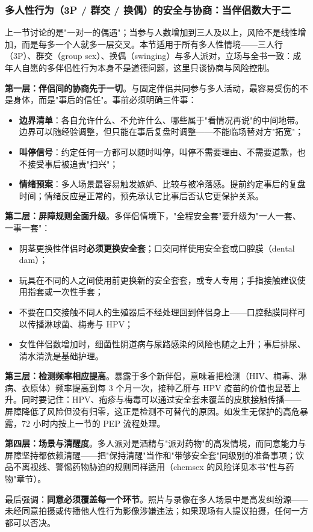 \subsubsection{多人性行为（3P / 群交 / 换偶）的安全与协商：当伴侣数大于二}

上一节讨论的是"一对一的偶遇"；当参与人数增加到三人及以上，风险不是线性增加，而是每多一个人就多一层交叉。本节适用于所有多人性情境——三人行（3P）、群交（group sex）、换偶（swinging）与多人派对，立场与全书一致：成年人自愿的多伴侣性行为本身不是道德问题，这里只谈协商与风险控制。

\textbf{第一层：伴侣间的协商先于一切}。与固定伴侣共同参与多人活动，最容易受伤的不是身体，而是"事后的信任"。事前必须明确三件事：
\begin{itemize}
\item \textbf{边界清单}：各自允许什么、不允许什么、哪些属于"看情况再说"的中间地带。边界可以随经验调整，但只能在事后复盘时调整——不能临场替对方"拓宽"；
\item \textbf{叫停信号}：约定任何一方都可以随时叫停，叫停不需要理由、不需要道歉，也不接受事后被追责"扫兴"；
\item \textbf{情绪预案}：多人场景最容易触发嫉妒、比较与被冷落感。提前约定事后的复盘时间；情绪反应是正常的，预先承认它比事后否认它更保护关系。
\end{itemize}

\textbf{第二层：屏障规则全面升级}。多伴侣情境下，"全程安全套"要升级为"一人一套、一事一套"：
\begin{itemize}
\item 阴茎更换性伴侣时\textbf{必须更换安全套}；口交同样使用安全套或口腔膜（dental dam）；
\item 玩具在不同的人之间使用前更换新的安全套套，或专人专用；手指接触建议使用指套或一次性手套；
\item 不要在口交接触不同人的生殖器后不经处理回到伴侣身上——口腔黏膜同样可以传播淋球菌、梅毒与 HPV；
\item 女性伴侣数增加时，细菌性阴道病与尿路感染的风险也随之上升；事后排尿、清水清洗是基础护理。
\end{itemize}

\textbf{第三层：检测频率相应提高}。暴露于多个新伴侣，意味着把检测（HIV、梅毒、淋病、衣原体）频率提高到每 3 个月一次，接种乙肝与 HPV 疫苗的价值也显著上升。同时要记住：HPV、疱疹与梅毒可以通过安全套未覆盖的皮肤接触传播——屏障降低了风险但没有归零，这正是检测不可替代的原因。如发生无保护的高危暴露，72 小时内按上一节的 PEP 流程处理。

\textbf{第四层：场景与清醒度}。多人派对是酒精与"派对药物"的高发情境，而同意能力与屏障坚持都依赖清醒——把"保持清醒"当作和"带够安全套"同级别的准备事项；饮品不离视线、警惕药物胁迫的规则同样适用（chemsex 的风险详见本书"性与药物"章节）。

最后强调：\textbf{同意必须覆盖每一个环节}。照片与录像在多人场景中是高发纠纷源——未经同意拍摄或传播他人性行为影像涉嫌违法；如果现场有人提议拍摄，任何一方都可以否决。
